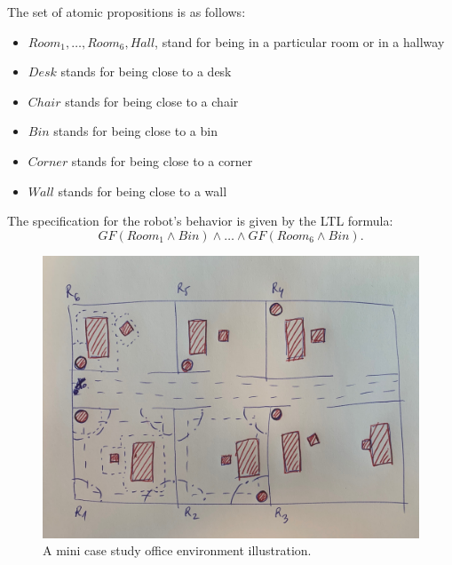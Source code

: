 \documentclass{article}
\begin{document}
The set of atomic propositions is as follows:
\begin{itemize}
\item $\mathit{Room}_1,\ldots,\mathit{Room}_6, \mathit{Hall}$, stand for being in a particular room or in a hallway
\item $\mathit{Desk}$ stands for being close to a desk
\item $\mathit{Chair}$ stands for being close to a chair
\item $\mathit{Bin}$ stands for being close to a bin
\item $\mathit{Corner}$ stands for being close to a corner
\item $\mathit{Wall}$ stands for being close to a wall
\end{itemize}

The specification for the robot's behavior is given by the LTL formula:
$$G F (\mathit{Room}_1 \wedge \mathit{Bin}) \wedge \ldots \wedge G F (\mathit{Room}_6 \wedge \mathit{Bin}).$$

\begin{figure}
\centering
\includegraphics[width=\linewidth]{Fig/small-office} \caption{A mini case study office environment illustration.}
\label{fig:office}
\end{figure}
\end{document}
